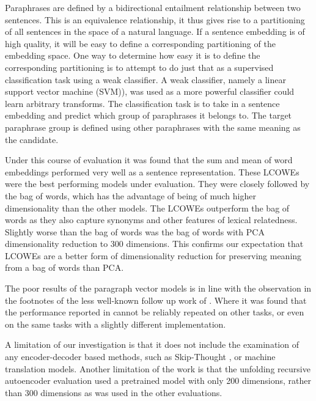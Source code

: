 \documentclass{book}
\begin{document}
Paraphrases are defined by a bidirectional entailment relationship between two sentences.
This is an equivalence relationship, it thus gives rise to a partitioning of all sentences in the space of a natural language.
If a sentence embedding is of high quality, it will be easy to define a corresponding partitioning of the embedding space.
One way to determine how easy it is to define the corresponding partitioning is to attempt to do just that as a supervised classification task using a weak classifier.
A weak classifier, namely a linear support vector machine (SVM)), was used as a more powerful classifier could learn arbitrary transforms.
The classification task is to take in a sentence embedding and predict which group of paraphrases it belongs to.
The target paraphrase group is defined using other paraphrases with the same meaning as the candidate.

Under this course of evaluation it was found that the sum and mean of word embeddings performed very well as a sentence representation.
These LCOWEs were the best performing models under evaluation.
They were closely followed by the bag of words, which has the advantage of being of much higher dimensionality than the other models.
The LCOWEs outperform the bag of words as they also capture  synonyms and other features of lexical relatedness.
Slightly worse than the bag of words was the bag of words with PCA dimensionality reduction to 300 dimensions.
This confirms our expectation that LCOWEs are a better form of dimensionality reduction for preserving meaning from a bag of words than PCA.


The poor results of the paragraph vector models \citep{le2014distributed} is in line with the observation in the footnotes of the less well-known follow up work of \citet{mesnil2014ensemble}.
Where it was found that the performance reported in \citet{le2014distributed} cannot be reliably repeated on other tasks, or even on the same tasks with a slightly different implementation.


A limitation of our investigation is that it does not include the examination of any encoder-decoder based methods, such as Skip-Thought \citep{DBLP:journals/corr/KirosZSZTUF15}, or machine translation models.
Another limitation of the work is that the unfolding recursive autoencoder \citep{SocherEtAl2011:PoolRAE}  evaluation used a pretrained model with only 200 dimensions, rather than 300 dimensions as was used in the other evaluations.
\end{document}

